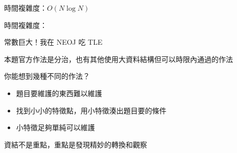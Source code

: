 \begin{frame}{}
     {
        時間複雜度：$O(N \log N)$
    }

     {
        時間複雜度：

        常數巨大！我在 NEOJ 吃 TLE
    }
\end{frame}

\begin{frame}{}
    本題官方作法是分治，也有其他使用大資料結構但可以時限內通過的作法

    你能想到幾種不同的作法？
\end{frame}

\begin{frame}{\ebtitle}
    \begin{itemize}
        \item 題目要維護的東西難以維護
        \item 找到小小的特徵點，用小特徵湊出題目要的條件
        \item 小特徵足夠單純可以維護
    \end{itemize}

    資結不是重點，重點是發現精妙的轉換和觀察
\end{frame}
